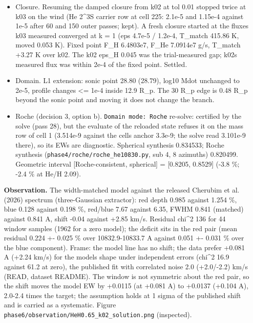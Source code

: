 \documentclass[english,a4paper]{my_memo}
\begin{document}
\begin{itemize}
\item
  Closure. Resuming the damped closure from k02 at tol 0.01 stopped twice at
  k03 on the wind (He 2\^{}3S carrier row at cell 225: 2.1e-5 and 1.15e-4
  against 1e-5 after 60 and 150 outer passes; kept). A fresh closure started
  at the fluxes k03 measured converged at k = 1 (eps 4.7e-5 / 1.2e-4,
  T\_match 415.86 K, moved 0.053 K). Fixed point F\_H 6.4803e7, F\_He 7.0914e7
  g/s, T\_match +3.27 K over k02. The k02 eps\_H 0.045 was the trial-measured
  gap; k02\textquotesingle s measured flux was within 2e-4 of the fixed point. Settled.
\item
  Domain. L1 extension: sonic point 28.80 (28.79), log10 Mdot unchanged to
  2e-5, profile changes \textless= 1e-4 inside 12.9 R\_p. The 30 R\_p edge is 0.48 R\_p
  beyond the sonic point and moving it does not change the branch.
\item
  Roche (decision 3, option b\textquotesingle). \texttt{Domain\ mode:\ Roche} re-solve: certified by
  the solve (pass 28), but the evaluate of the reloaded state refuses it on
  the mass row of cell 1 (3.514e-9 against the cell\textquotesingle s anchor 3.3e-9; the
  solve read 3.101e-9 there), so its EWs are diagnostic. Spherical synthesis
  0.834533; Roche synthesis (\texttt{phase4/roche/roche\_he10830.py}, sub 4, 8
  azimuths) 0.820499. Geometric interval {[}Roche-consistent, spherical{]} =
  {[}0.8205, 0.8529{]} (-3.8 \%; -2.4 \% at He/H 2.09).
\end{itemize}

\textbf{Observation.} The width-matched model against the released Cherubim et
al. (2026) spectrum (three-Gaussian extractor): red depth 0.985 against
1.254 \%, blue 0.128 against 0.198 \%, red/blue 7.67 against 6.35, FWHM 0.841
(matched) against 0.841 A, shift -0.04 against +2.85 km/s. Residual chi\^{}2
136 for 44 window samples (1962 for a zero model); the deficit sits in the
red pair (mean residual 0.224 +- 0.025 \% over 10832.9-10833.7 A against
0.051 +- 0.031 \% over the blue component). Frame: the model line has no
shift; the data prefer +0.081 A (+2.24 km/s) for the model\textquotesingle s shape under
independent errors (chi\^{}2 16.9 against 61.2 at zero), the published fit with
correlated noise 2.0 (+2.0/-2.2) km/s (READ, dataset README). The window is
not symmetric about the red pair, so the shift moves the model EW by +0.0115
(at +0.081 A) to +0.0137 (+0.104 A), 2.0-2.4 times the target; the
assumption holds at 1 sigma of the published shift and is carried as a
systematic. Figure \texttt{phase6/observation/HeH0.65\_k02\_solution.png}
(inspected).
\end{document}
